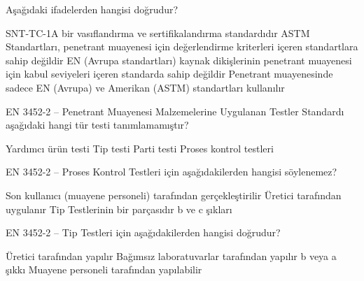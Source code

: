 \begin{question}[subtitle=]
Aşağıdaki ifadelerden hangisi doğrudur?
	\begin{tasks}
          \task SNT-TC-1A bir vasıflandırma ve sertifikalandırma standardıdır 
          \task ASTM Standartları, penetrant muayenesi için değerlendirme kriterleri içeren standartlara sahip değildir \correct
          \task EN (Avrupa standartları) kaynak dikişlerinin penetrant muayenesi için kabul seviyeleri içeren standarda sahip değildir
          \task Penetrant muayenesinde sadece EN (Avrupa) ve Amerikan (ASTM) standartları kullanılır
	\end{tasks}
\end{question}
\begin{solution}
	\correct
\end{solution}

\begin{question}[subtitle=]
EN 3452-2 – Penetrant Muayenesi Malzemelerine Uygulanan Testler  Standardı aşağıdaki hangi tür testi tanımlamamıştır?
	\begin{tasks}
          \task Yardımcı ürün testi \correct
          \task Tip testi
          \task Parti testi
          \task Proses kontrol testleri
	\end{tasks}
\end{question}
\begin{solution}
	\correct
\end{solution}

\begin{question}[subtitle=]
EN 3452-2 – Proses Kontrol Testleri için aşağıdakilerden hangisi söylenemez?
	\begin{tasks}
          \task Son kullanıcı (muayene personeli) tarafından gerçekleştirilir
          \task Üretici tarafından uygulanır
          \task Tip Testlerinin bir parçasıdır
          \task b ve c şıkları \correct
	\end{tasks}
\end{question}
\begin{solution}
	\correct
\end{solution}

\begin{question}[subtitle=]
EN 3452-2 – Tip Testleri için aşağıdakilerden hangisi doğrudur?
	\begin{tasks}
          \task Üretici tarafından yapılır
          \task Bağımsız laboratuvarlar tarafından yapılır \correct
          \task b veya a şıkkı
          \task Muayene personeli tarafından yapılabilir
	\end{tasks}
\end{question}
\begin{solution}
	\correct
\end{solution}

